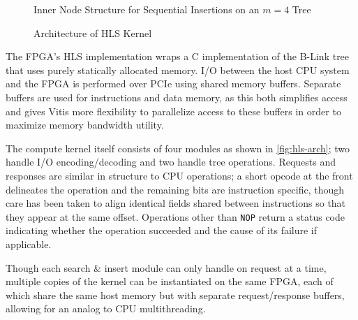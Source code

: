 \begin{figure}
	\centering
	
	\caption{Inner Node Structure for Sequential Insertions on an $m=4$ Tree}
	\label{fig:sequential-imbalance}
\end{figure}



\begin{figure}
	\centering
	
	\caption{Architecture of HLS Kernel}
	\label{fig:hls-arch}
\end{figure}

The FPGA's HLS implementation wraps a C implementation of the B-Link tree that
uses purely statically allocated memory. I/O between the host CPU system and the
FPGA is performed over PCIe using shared memory buffers. Separate buffers are
used for instructions and data memory, as this both simplifies access and gives
Vitis more flexibility to parallelize access to these buffers in order to
maximize memory bandwidth utility.

The compute kernel itself consists of four modules as shown in
\autoref{fig:hls-arch}; two handle I/O encoding/decoding and two handle tree
operations. Requests and responses are similar in structure to CPU operations; a
short opcode at the front delineates the operation and the remaining bits are
instruction specific, though care has been taken to align identical fields
shared between instructions so that they appear at the same offset. Operations
other than \texttt{NOP} return a status code indicating whether the operation
succeeded and the cause of its failure if applicable.

Though each search \& insert module can only handle on request at a time,
multiple copies of the kernel can be instantiated on the same FPGA, each of
which share the same host memory but with separate request/response buffers,
allowing for an analog to CPU multithreading.
